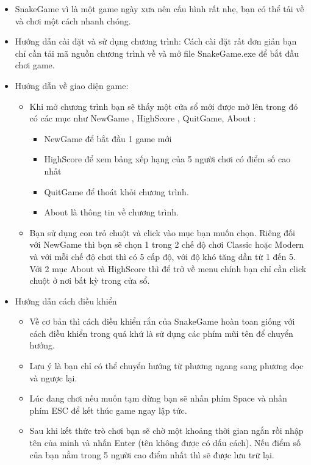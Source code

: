 \documentclass[13pt,a4paper]{article}
\begin{document}
\begin{itemize}
    \item  SnakeGame vì là một game ngày xưa nên cấu hình rất nhẹ, bạn có thể tải về và chơi  một cách nhanh chóng.
    \item Hướng dẫn cài đặt và sử dụng chương trình:  Cách cài đặt rất đơn giản bạn chỉ cần tải mã nguồn chương trình về và mở file SnakeGame.exe để bắt đầu chơi game.
    \item Hướng dẫn về giao diện game:
      \begin{itemize}
    \item  Khi mở chương trình bạn sẽ thấy một cửa sổ mới được mở lên  trong đó có các mục như NewGame , HighScore , QuitGame, About :
    \begin{itemize}
    \item  NewGame để bắt đầu 1 game mới
	\item HighScore để xem bảng xếp hạng của 5 người chơi có điểm số cao nhất
	\item QuitGame để thoát khỏi chương trình.
	\item About là thông tin về chương trình.
    \end{itemize}
	
\item Bạn sử dụng con trỏ chuột và click vào mục bạn muốn chọn. Riêng đối với NewGame thì bọn sẽ chọn 1 trong 2 chế độ chơi Classic hoặc Modern và với mỗi chế độ chơi thì có 5 cấp độ, với độ khó tăng dần từ 1 đến 5. Với 2 mục About và HighScore thì để trở về menu chính bạn chỉ cần click chuột ở nơi bất kỳ trong cửa sổ.
\end{itemize}
\item Hướng dẫn cách điều khiển
\begin{itemize}
    \item Về cơ bản thì cách điều khiển rắn của SnakeGame hoàn toan giống với cách điều khiển trong quá khứ là sử dụng các phím mũi tên để chuyển hướng.
    \item Lưu ý là bạn chỉ có thể chuyển hướng từ phương ngang sang phương dọc và ngược lại.
    \item Lúc đang chơi nếu muốn tạm dừng bạn sẽ nhấn phím Space và nhấn phím ESC để kết thúc game ngay lập tức.
    \item Sau khi kết thức trò chơi bạn sẽ chờ một khoảng thời gian ngắn rồi nhập tên của minh và nhấn Enter (tên không được có dấu cách). Nếu điểm số của bạn nằm trong 5 người cao điểm nhất thì sẽ được lưu trữ lại.
\end{itemize}


\end{itemize}
\end{document}
